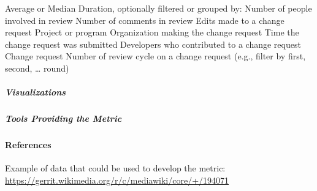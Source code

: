 Average or Median Duration, optionally filtered or grouped by: Number of
people involved in review Number of comments in review Edits made to a
change request Project or program Organization making the change request
Time the change request was submitted Developers who contributed to a
change request Change request Number of review cycle on a change request
(e.g., filter by first, second, \ldots{} round)

\hypertarget{visualizations}{%
\subparagraph{Visualizations}\label{visualizations}}

\hypertarget{tools-providing-the-metric}{%
\subparagraph{Tools Providing the
Metric}\label{tools-providing-the-metric}}

\hypertarget{references}{%
\paragraph{References}\label{references}}

Example of data that could be used to develop the metric:
\url{https://gerrit.wikimedia.org/r/c/mediawiki/core/+/194071}

